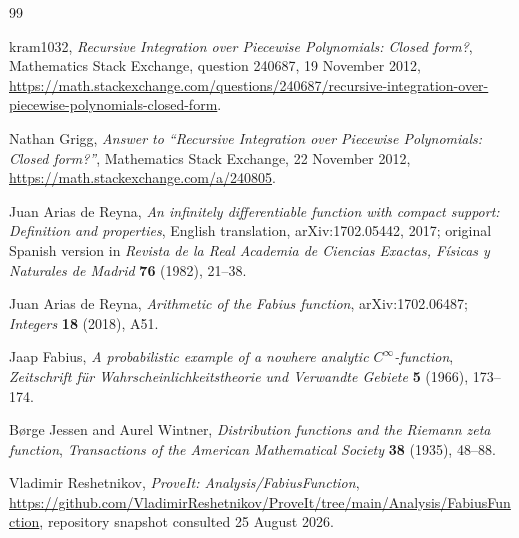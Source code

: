 \documentclass[11pt,oneside]{article}
\theoremstyle{definition}
\theoremstyle{remark}
\begin{document}
\renewcommand{\refname}{Dossier references}
\begin{thebibliography}{99}

kram1032,
\emph{Recursive Integration over Piecewise Polynomials: Closed form?},
Mathematics Stack Exchange, question 240687, 19 November 2012,
\url{https://math.stackexchange.com/questions/240687/recursive-integration-over-piecewise-polynomials-closed-form}.

Nathan Grigg,
\emph{Answer to ``Recursive Integration over Piecewise Polynomials: Closed form?''},
Mathematics Stack Exchange, 22 November 2012,
\url{https://math.stackexchange.com/a/240805}.

Juan Arias de Reyna,
\emph{An infinitely differentiable function with compact support: Definition and
properties},
English translation, arXiv:1702.05442, 2017; original Spanish version in
\emph{Revista de la Real Academia de Ciencias Exactas, Físicas y Naturales de Madrid}
\textbf{76} (1982), 21--38.

Juan Arias de Reyna,
\emph{Arithmetic of the Fabius function},
arXiv:1702.06487; \emph{Integers} \textbf{18} (2018), A51.

Jaap Fabius,
\emph{A probabilistic example of a nowhere analytic $C^\infty$-function},
\emph{Zeitschrift für Wahrscheinlichkeitstheorie und Verwandte Gebiete}
\textbf{5} (1966), 173--174.

Børge Jessen and Aurel Wintner,
\emph{Distribution functions and the Riemann zeta function},
\emph{Transactions of the American Mathematical Society}
\textbf{38} (1935), 48--88.

Vladimir Reshetnikov,
\emph{ProveIt: Analysis/FabiusFunction},
\url{https://github.com/VladimirReshetnikov/ProveIt/tree/main/Analysis/FabiusFunction},
repository snapshot consulted 25 August 2026.

\end{thebibliography}


\renewcommand{\arraystretch}{1}



\clearpage
\end{document}
